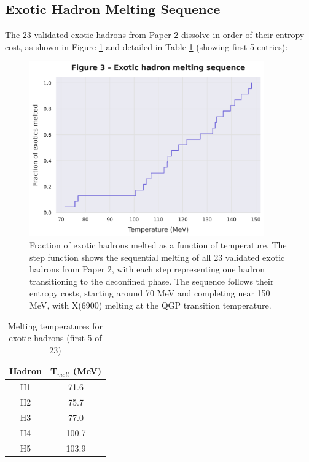 \documentclass[12pt,a4paper]{article}
\begin{document}
\subsection{Exotic Hadron Melting Sequence}

The 23 validated exotic hadrons from Paper 2 dissolve in order of their entropy cost, as shown in Figure \ref{fig:melting} and detailed in Table \ref{tab:melting} (showing first 5 entries):

\begin{figure}[H]
\centering
\includegraphics[width=0.9\textwidth]{figures/figure3_melting_sequence.png}
\caption{Fraction of exotic hadrons melted as a function of temperature. The step function shows the sequential melting of all 23 validated exotic hadrons from Paper 2, with each step representing one hadron transitioning to the deconfined phase. The sequence follows their entropy costs, starting around 70 MeV and completing near 150 MeV, with X(6900) melting at the QGP transition temperature.}
\label{fig:melting}
\end{figure}

\begin{table}[H]
\centering
\caption{Melting temperatures for exotic hadrons (first 5 of 23)}
\label{tab:melting}
\begin{tabular}{|c|c|}
\hline
Hadron & T$_{melt}$ (MeV) \\
\hline
H1 & 71.6 \\
H2 & 75.7 \\
H3 & 77.0 \\
H4 & 100.7 \\
H5 & 103.9 \\
\hline
\end{tabular}
\end{table}
\end{document}
